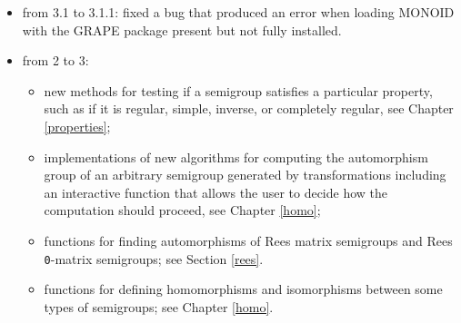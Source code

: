 \documentclass[a4paper,11pt]{report}
\begin{document}
{{\begin{itemize}
\item from 3.1 to 3.1.1: fixed a bug that produced an error when loading MONOID with
the GRAPE package present but not fully installed.
\item from 2 to 3: 
\begin{itemize}
\item  new methods for testing if a semigroup satisfies a particular property, such
as if it is regular, simple, inverse, or completely regular, see Chapter \ref{properties};
\item  implementations of new algorithms for computing the automorphism group of an
arbitrary semigroup generated by transformations including an interactive
function that allows the user to decide how the computation should proceed,
see Chapter \ref{homo}; 
\item  functions for finding automorphisms of Rees matrix semigroups and Rees \texttt{0}-matrix semigroups; see Section \ref{rees}.
\item  functions for defining homomorphisms and isomorphisms between some types of
semigroups; see Chapter \ref{homo}.
\end{itemize}
 
\end{itemize}
 }

  }

  
\end{document}
